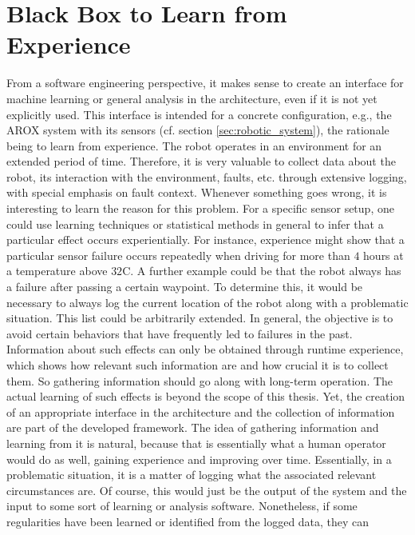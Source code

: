 \documentclass[english, master, utf8]{base/thesis_KBS}
\begin{document}
\vfill
\pagebreak

\section{Black Box to Learn from Experience}
\label{sec:black_box}

From a software engineering perspective, it makes sense to create an interface for machine learning or general analysis in the architecture, even if it is not yet explicitly used.
This interface is intended for a concrete configuration, e.g., the AROX system with its sensors (cf. section \ref{sec:robotic_system}), the rationale being to learn from experience. The robot operates in an environment for an
extended period of time. Therefore, it is very valuable to collect data about the robot, its interaction with the environment, faults, etc. through extensive logging, with special
emphasis on fault context. Whenever something goes wrong, it is interesting to learn the reason for this problem. For a specific sensor setup, one could use learning techniques or
statistical methods in general to infer that a particular effect occurs experientially. For instance, experience might show that a particular sensor failure occurs repeatedly when
driving for more than $4$ hours at a temperature above $32$\textdegree{}C. A further example could be that the robot always has a failure after passing a certain waypoint.
To determine this, it would be necessary to always log the current location of the robot along with a problematic situation. This list could be arbitrarily extended.
In general, the objective is to avoid certain behaviors that have frequently led to failures in the past. Information about such effects can only be
obtained through runtime experience, which shows how relevant such information are and how crucial it is to collect them. So gathering information should go along with long-term
operation. The actual learning of such effects is beyond the scope of this thesis. Yet, the creation of an appropriate interface in the architecture and the collection of information
are part of the developed framework. The idea of gathering information and learning from it is natural, because that is essentially what a human operator would do as well, gaining
experience and improving over time. Essentially, in a problematic situation, it is a matter of logging what the associated relevant circumstances are. Of course, this would just be
the output of the system and the input to some sort of learning or analysis software. Nonetheless, if some regularities have been learned or identified from the logged data, they can
\end{document}
